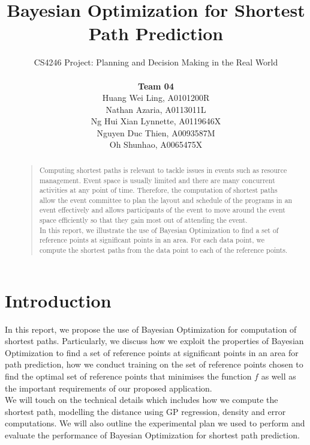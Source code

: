\documentclass[letterpaper]{article}
\begin{document}
%
\title{Bayesian Optimization for Shortest Path Prediction}
\author{CS4246 Project: Planning and Decision Making in the Real World  \\ \\
{\bf Team 04} \\
Huang Wei Ling, A0101200R\\
Nathan Azaria, A0113011L\\
Ng Hui Xian Lynnette, A0119646X\\
Nguyen Duc Thien, A0093587M\\
Oh Shunhao, A0065475X\\
}
\maketitle
\begin{abstract}
\begin{quote}
Computing shortest paths is relevant to tackle issues in events such as resource management. Event space is usually limited and there are many concurrent activities at any point of time. Therefore, the computation of shortest paths allow the event committee to plan the layout and schedule of the programs in an event effectively and allows participants of the event to move around the event space efficiently so that they gain most out of attending the event. \\

In this report, we illustrate the use of Bayesian Optimization to find a set of reference points at significant points in an area. For each data point, we compute the shortest paths from the data point to each of the reference points.
\end{quote}
\end{abstract}

\section{Introduction}
In this report, we propose the use of Bayesian Optimization for computation of shortest paths. Particularly, we discuss how we exploit the properties of Bayesian Optimization to find a set of reference points at significant points in an area for path prediction, how we conduct training on the set of reference points chosen to find the optimal set of reference points that minimises the function $f$ as well as the important requirements of our proposed application. \\

We will touch on the technical details which includes how we compute the shortest path, modelling the distance using GP regression, density and error computations. We will also outline the experimental plan we used to perform and evaluate the performance of Bayesian Optimization for shortest path prediction. \\
\end{document}
